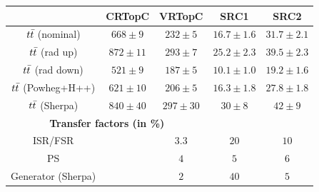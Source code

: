  \begin{table}[!h]
    \begin{center} \footnotesize
    
        \begin{tabular}{|c|c|c|c|c|}
	\noalign{\smallskip}\noalign{\smallskip}\hline
        & CRTopC & VRTopC & SRC1 & SRC2\\
        \hline
$t\bar{t}$ (nominal)&   $668\pm 9 $&         $232\pm 5 $ &    $16.7\pm 1.6 $&         $31.7\pm 2.1 $\\
$t\bar{t}$ (rad up)&          $872\pm 11 $&         $293\pm 7 $ &            $25.2\pm 2.3 $&         $39.5\pm 2.3 $\\
$t\bar{t}$ (rad down)&        $521\pm 9 $&   $187\pm 5 $ &         $10.1\pm 1.0 $&         $19.2\pm 1.6 $\\
$t\bar{t}$ (Powheg+H++)&      $621\pm 10 $&         $206\pm 5 $&      $16.3\pm 1.8 $&         $27.8\pm 1.8 $\\
$t\bar{t}$ (Sherpa)&          $840\pm 40 $&        $297\pm 30 $&            $30\pm 8 $&     $42\pm 9 $\\        
        \hline
        \multicolumn{3}{c}{\bf Transfer factors (in \%)} \\ \hline
        ISR/FSR &  &    $3.3$&      $20$&   $10$\\
        PS &     &   $4$&   $5$&    $6$\\
        Generator (Sherpa) &    &          $2$&    $40$&   $5$\\
        \hline       
        \end{tabular}
    

\end{center}
\end{table}
